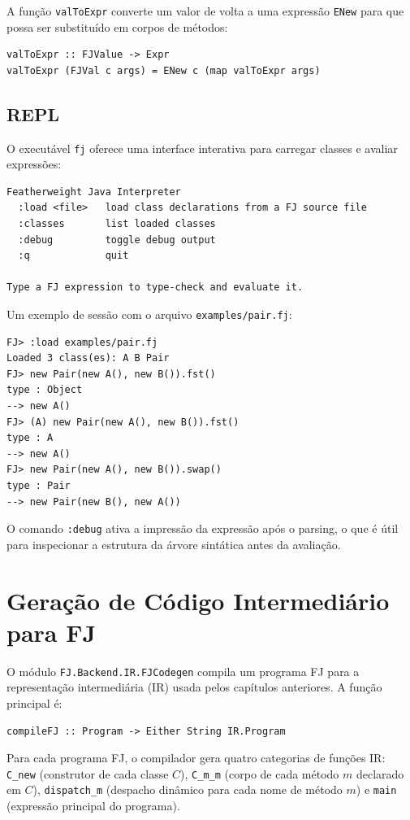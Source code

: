 A função \texttt{valToExpr} converte um valor de
volta a uma expressão \texttt{ENew} para que possa
ser substituído em corpos de métodos:

\begin{verbatim}
valToExpr :: FJValue -> Expr
valToExpr (FJVal c args) = ENew c (map valToExpr args)
\end{verbatim}

\subsection{REPL}

O executável \texttt{fj} oferece uma interface
interativa para carregar classes e avaliar expressões:

\begin{verbatim}
Featherweight Java Interpreter
  :load <file>   load class declarations from a FJ source file
  :classes       list loaded classes
  :debug         toggle debug output
  :q             quit

Type a FJ expression to type-check and evaluate it.
\end{verbatim}

Um exemplo de sessão com o arquivo \texttt{examples/pair.fj}:

\begin{verbatim}
FJ> :load examples/pair.fj
Loaded 3 class(es): A B Pair
FJ> new Pair(new A(), new B()).fst()
type : Object
--> new A()
FJ> (A) new Pair(new A(), new B()).fst()
type : A
--> new A()
FJ> new Pair(new A(), new B()).swap()
type : Pair
--> new Pair(new B(), new A())
\end{verbatim}

O comando \texttt{:debug} ativa a impressão da
expressão após o parsing, o que é útil para inspecionar a estrutura
da árvore sintática antes da avaliação.

\section{Geração de Código Intermediário para FJ}

O módulo \texttt{FJ.Backend.IR.FJCodegen} compila um programa FJ para
a representação intermediária (IR) usada pelos capítulos anteriores.
A função principal é:

\begin{verbatim}
compileFJ :: Program -> Either String IR.Program
\end{verbatim}

Para cada programa FJ, o compilador gera quatro categorias de funções IR:
\texttt{C\_new} (construtor de cada classe \(C\)),
\texttt{C\_m\_m} (corpo de cada método \(m\) declarado em \(C\)),
\texttt{dispatch\_m} (despacho dinâmico para cada nome de método \(m\)) e
\texttt{main} (expressão principal do programa).

